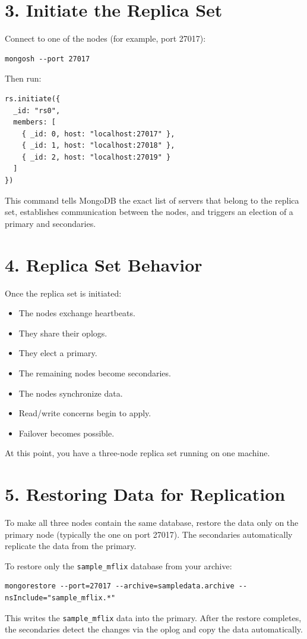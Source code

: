 \documentclass[9pt]{article}
\begin{document}
\section*{3. Initiate the Replica Set}

Connect to one of the nodes (for example, port 27017):

\begin{verbatim}
mongosh --port 27017
\end{verbatim}

Then run:

\begin{verbatim}
rs.initiate({
  _id: "rs0",
  members: [
    { _id: 0, host: "localhost:27017" },
    { _id: 1, host: "localhost:27018" },
    { _id: 2, host: "localhost:27019" }
  ]
})
\end{verbatim}

This command tells MongoDB the exact list of servers that belong to the replica set,
establishes communication between the nodes, and triggers an election of a primary
and secondaries.

\section*{4. Replica Set Behavior}

Once the replica set is initiated:
\begin{itemize}
    \item The nodes exchange heartbeats.
    \item They share their oplogs.
    \item They elect a primary.
    \item The remaining nodes become secondaries.
    \item The nodes synchronize data.
    \item Read/write concerns begin to apply.
    \item Failover becomes possible.
\end{itemize}

At this point, you have a three-node replica set running on one machine.

\section*{5. Restoring Data for Replication}

To make all three nodes contain the same database, restore the data only on the
primary node (typically the one on port 27017). The secondaries automatically
replicate the data from the primary.

To restore only the \texttt{sample\_mflix} database from your archive:

\begin{verbatim}
mongorestore --port=27017 --archive=sampledata.archive --nsInclude="sample_mflix.*"
\end{verbatim}

This writes the \texttt{sample\_mflix} data into the primary. After the restore
completes, the secondaries detect the changes via the oplog and copy the data
automatically.
\end{document}
